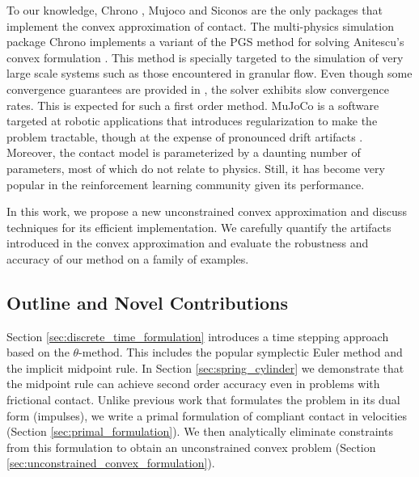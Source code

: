 To our knowledge, Chrono \cite{bib:chrono2016}, Mujoco \cite{bib:mujoco} and
Siconos \cite{bib:acary2019siconos} are the only packages that implement the
convex approximation of contact. The multi-physics simulation package Chrono
implements a variant of the PGS method for solving Anitescu's convex formulation
\cite{bib:tasora2011}. This method is specially targeted to the simulation of
very large scale systems such as those encountered in granular flow. Even though
some convergence guarantees are provided in \cite{bib:anitescu2010}, the solver
exhibits slow convergence rates. This is expected for such a first order method.
MuJoCo is a software targeted at robotic applications that introduces
regularization to make the problem tractable, though at the expense of
pronounced drift artifacts \cite{bib:simbenchmark}. Moreover, the contact model
is parameterized by a daunting number of parameters, most of which do not relate
to physics. Still, it has become very popular in the reinforcement learning
community given its performance.

 In this work, we propose a new
unconstrained convex approximation and discuss techniques for its efficient
implementation. We carefully quantify the artifacts introduced in the convex
approximation and evaluate the robustness and accuracy of our method on a family
of examples.

\subsection{Outline and Novel Contributions}
Section \ref{sec:discrete_time_formulation} introduces a time stepping approach
based on the $\theta\text{-method}$. This includes the popular symplectic Euler
method and the implicit midpoint rule. In Section \ref{sec:spring_cylinder} we
demonstrate that the midpoint rule can achieve second order accuracy even in
problems with frictional contact. Unlike previous work
\cite{bib:anitescu2010,bib:todorov2014} that formulates the problem in its dual
form (impulses), we write a primal formulation of compliant contact in
velocities (Section \ref{sec:primal_formulation}). We then analytically
eliminate constraints from this formulation to obtain an unconstrained convex
problem (Section \ref{sec:unconstrained_convex_formulation}).

